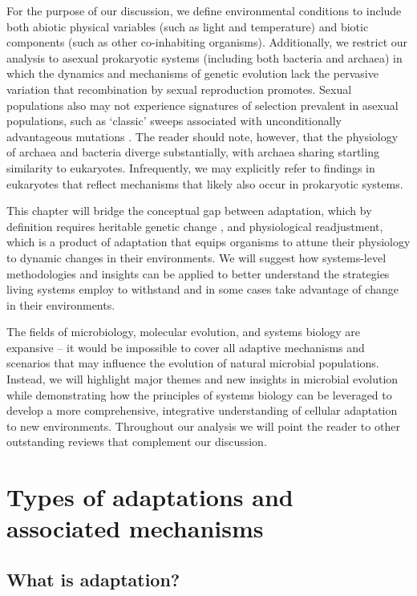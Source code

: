 For the purpose of our discussion, we define environmental conditions to include both abiotic physical variables (such as light and temperature) and biotic components (such as other co-inhabiting organisms).  Additionally, we restrict our analysis to asexual prokaryotic systems (including both bacteria and archaea) in which the dynamics and mechanisms of genetic evolution lack the pervasive variation that recombination by sexual reproduction promotes. Sexual populations also may not experience signatures of selection prevalent in asexual populations, such as ‘classic’ sweeps associated with unconditionally advantageous mutations \cite{burke_genome-wide_2010}. The reader should note, however, that the physiology of archaea and bacteria diverge substantially, with archaea sharing startling similarity to eukaryotes. Infrequently, we may explicitly refer to findings in eukaryotes that reflect mechanisms that likely also occur in prokaryotic systems. 

This chapter will bridge the conceptual gap between adaptation, which by definition requires heritable genetic change \cite{barton_evolution_2007}, and physiological readjustment, which is a product of adaptation that equips organisms to attune their physiology to dynamic changes in their environments. We will suggest how systems-level methodologies and insights can be applied to better understand the strategies living systems employ to withstand and in some cases take advantage of change in their environments. 

The fields of microbiology, molecular evolution, and systems biology are expansive – it would be impossible to cover all adaptive mechanisms and scenarios that may influence the evolution of natural microbial populations. Instead, we will highlight major themes and new insights in microbial evolution while demonstrating how the principles of systems biology can be leveraged to develop a more comprehensive, integrative understanding of cellular adaptation to new environments. Throughout our analysis we will point the reader to other outstanding reviews that complement our discussion.
  
\section{Types of adaptations and associated mechanisms} 

\subsection{What is adaptation?}   

